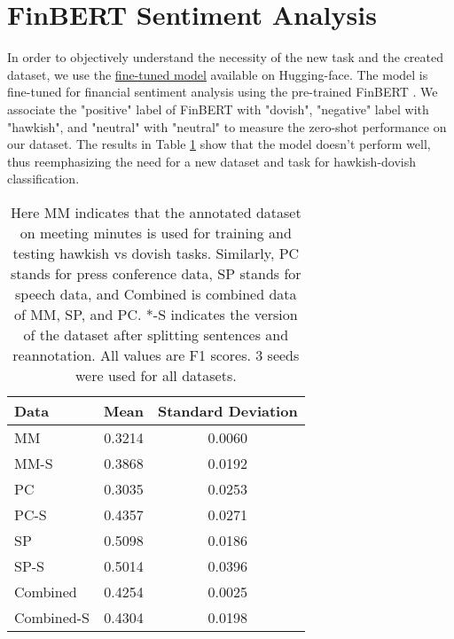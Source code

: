 \documentclass[11pt]{article}
\begin{document}



\appendix
\section{FinBERT Sentiment Analysis}
\label{ap:finbert_senti}
In order to objectively understand the necessity of the new task and the created dataset, we use the \href{https://huggingface.co/ipuneetrathore/bert-base-cased-finetuned-finBERT}{fine-tuned model} available on Hugging-face. The model is fine-tuned for financial sentiment analysis using the pre-trained FinBERT \citep{orig_finbert}. We associate the "positive" label of FinBERT with "dovish", "negative" label with "hawkish", and "neutral" with "neutral" to measure the zero-shot performance on our dataset. The results in Table \ref{tb:finbert_senti} show that the model doesn't perform well, thus reemphasizing the need for a new dataset and task for hawkish-dovish classification. 

\begin{table}[h]
\centering
\footnotesize
\begin{tabular}{lcc}
\hline
\textbf{Data} & \textbf{Mean} & \textbf{Standard Deviation} \\
\hline
MM & 0.3214 & 0.0060 \\
MM-S & 0.3868 & 0.0192 \\
PC & 0.3035 & 0.0253\\ 
PC-S & 0.4357 & 0.0271 \\
SP & 0.5098 & 0.0186 \\
SP-S & 0.5014 & 0.0396 \\
Combined & 0.4254 & 0.0025 \\
Combined-S & 0.4304 & 0.0198 \\
\hline
\end{tabular}
\caption{Here MM indicates that the annotated dataset on meeting minutes is used for training and testing hawkish vs dovish tasks. Similarly, PC stands for press conference data, SP stands for speech data, and Combined is combined data of MM, SP, and PC. *-S indicates the version of the dataset after splitting sentences and reannotation. All  values are F1 scores. 3 seeds were used for all datasets.}
\label{tb:finbert_senti}
\end{table}
\end{document}

